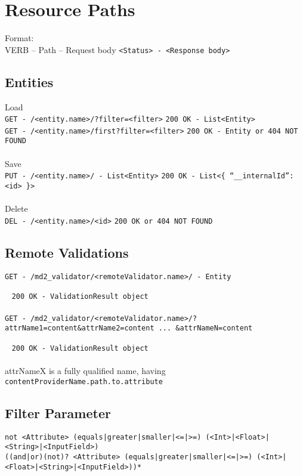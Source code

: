 
\section{Resource Paths}
Format: \\
VERB -- Path -- Request body \hfill \lstinline|<Status> - <Response body>|

\subsection*{Entities}

Load\\
\lstinline|GET - /<entity.name>/?filter=<filter>| \hfill \lstinline|200 OK - List<Entity>| \\
\lstinline|GET - /<entity.name>/first?filter=<filter>| \hfill \lstinline|200 OK - Entity or 404 NOT FOUND|
\\
\\
Save\\
\lstinline|PUT - /<entity.name>/ - List<Entity>| \hfill \lstinline|200 OK - List<{ “__internalId”: <id> }>|
\\
\\
Delete\\
\lstinline|DEL - /<entity.name>/<id>| \hfill \lstinline|200 OK or 404 NOT FOUND|


\subsection*{Remote Validations}
\lstinline|GET - /md2_validator/<remoteValidator.name>/ - Entity| 

~ \hfill \lstinline|200 OK - ValidationResult object|
\\ \\
\lstinline|GET - /md2_validator/<remoteValidator.name>/?attrName1=content&attrName2=content ... &attrNameN=content| 

~ \hfill \lstinline|200 OK - ValidationResult object|
\\
\\
attrNameX is a fully qualified name, having \\
\lstinline|contentProviderName.path.to.attribute|


\subsection*{Filter Parameter}
\begin{lstlisting}[language=Simple]
not <Attribute> (equals|greater|smaller|<=|>=) (<Int>|<Float>|<String>|<InputField>)
((and|or)(not)? <Attribute> (equals|greater|smaller|<=|>=) (<Int>|<Float>|<String>|<InputField>))*
\end{lstlisting}

